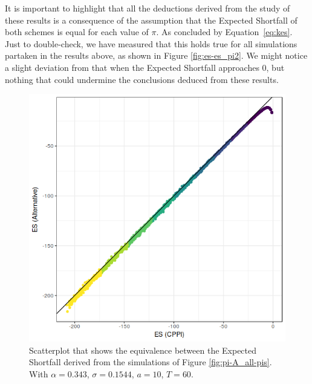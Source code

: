 It is important to highlight that all the deductions derived from the study of these results is a consequence of the assumption that the Expected Shortfall of both schemes is equal for each value of $\pi$. As concluded by Equation~\ref{eq:kes}. Just to double-check, we have measured that this holds true for all simulations partaken in the results above, as shown in Figure \ref{fig:es-es_pi2}. We might notice a slight deviation from that when the Expected Shortfall approaches 0, but nothing that could undermine the conclusions deduced from these results.


\begin{figure}[h]
    \centering
    \includegraphics[scale=0.75]{./images/es-es_pi.png}
    \caption{Scatterplot that shows the equivalence between the Expected Shortfall derived from the simulations of Figure \ref{fig:pi-A_all-pis}. With $\alpha = 0.343$, $\sigma = 0.1544$, $a = 10$, $T = 60$.}
    \label{fig:es-es_pi}
\end{figure}


